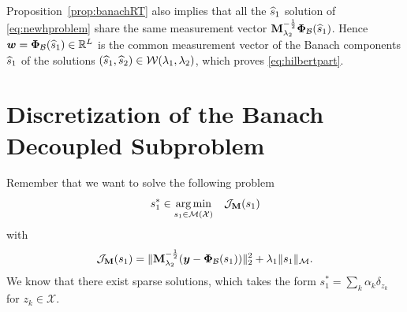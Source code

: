     Proposition~\ref{prop:banachRT} also implies that all the $\widehat{s}_1$ solution of \eqref{eq:newhproblem} share the same measurement vector $\mathbf{M}_{\lambda_{2}}^{-\frac{1}{2}} \bm{\Phi}_\mathcal{B} (\widehat{s}_1)$. Hence $\bm{w} = \bm{\Phi}_\mathcal{B}(\widehat{s}_1) \in \mathbb{R}^L$ is the common measurement vector of the Banach components $\widehat{s}_1$ of the solutions $(\widehat{s}_1 , \widehat{s}_2) \in \mathcal{W} (\lambda_{1},\lambda_{2})$, which proves \eqref{eq:hilbertpart}.

    

\clearpage
\section{Discretization of the Banach Decoupled Subproblem}
    \label{app:discretization}
        Remember that we want to solve the following problem
        $$s_1^* \in \underset{ s_1\in{\mathcal{M}}({\mathcal{X}})}{\arg\min} \quad \mathcal{J}_{\mathbf{M}}(s_1)$$
        with
        $$\mathcal{J}_{\mathbf{M}}(s_1)= \|\mathbf{M}_{\lambda_{2}}^{-\frac{1}{2}} ( \bm{y} - \bm{\Phi}_\mathcal{B}(s_1)  ) \|_2^2  + \lambda_{1} \| s_1 \|_{\mathcal{M}}.$$
        We know that there exist sparse solutions, which takes the form $s_1^* = \sum_k \alpha_k \delta_{z_k}$ for $z_k\in\mathcal{X}$.

